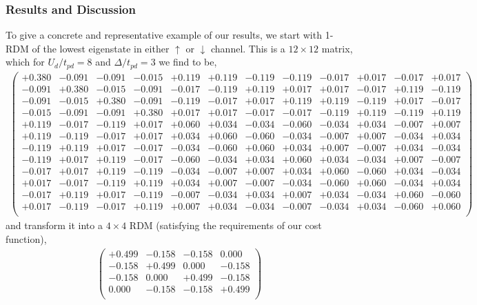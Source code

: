 \subsubsection{Results and Discussion}
To give a concrete and representative example of our results, we start with 1-RDM of the lowest eigenstate 
in either $\uparrow$ or $\downarrow$ channel. This is a $12 \times 12$ matrix, which for $U_{d}/t_{pd}=8$ 
and $\Delta/t_{pd}=3$ we find to be,
\begin{eqnarray}
\left(
\begin{array}{cccccccccccc}
+0.380	   & -0.091 &-0.091 &-0.015& +0.119& +0.119& -0.119 &-0.119 &-0.017 &+0.017 &-0.017 &+0.017 \\
-0.091	   & +0.380 &-0.015 &-0.091& -0.017& -0.119& +0.119 &+0.017 &+0.017 &-0.017 &+0.119 &-0.119 \\
-0.091	   & -0.015 &+0.380 &-0.091& -0.119& -0.017& +0.017 &+0.119 &+0.119 &-0.119 &+0.017 &-0.017 \\
-0.015	   & -0.091 &-0.091 &+0.380& +0.017& +0.017& -0.017 &-0.017 &-0.119 &+0.119 &-0.119 &+0.119 \\
+0.119	   & -0.017 &-0.119 &+0.017& +0.060& +0.034& -0.034 &-0.060 &-0.034 &+0.034 &-0.007 &+0.007 \\
+0.119	   & -0.119 &-0.017 &+0.017& +0.034& +0.060& -0.060 &-0.034 &-0.007 &+0.007 &-0.034 &+0.034 \\
-0.119	   & +0.119 &+0.017 &-0.017& -0.034& -0.060& +0.060 &+0.034 &+0.007 &-0.007 &+0.034 &-0.034 \\
-0.119	   & +0.017 &+0.119 &-0.017& -0.060& -0.034& +0.034 &+0.060 &+0.034 &-0.034 &+0.007 &-0.007 \\
-0.017	   & +0.017 &+0.119 &-0.119& -0.034& -0.007& +0.007 &+0.034 &+0.060 &-0.060 &+0.034 &-0.034 \\
+0.017	   & -0.017 &-0.119 &+0.119& +0.034& +0.007& -0.007 &-0.034 &-0.060 &+0.060 &-0.034 &+0.034 \\
-0.017	   & +0.119 &+0.017 &-0.119& -0.007& -0.034& +0.034 &+0.007 &+0.034 &-0.034 &+0.060 &-0.060 \\
+0.017	   & -0.119 &-0.017 &+0.119& +0.007& +0.034& -0.034 &-0.007 &-0.034 &+0.034 &-0.060 &+0.060 \\
\end{array}
\right)
\end{eqnarray}
and transform it into a $4\times4$ RDM (satisfying the requirements of our cost function), 
\begin{eqnarray}
\left(
\begin{array}{cccc}
+0.499 & -0.158 & -0.158 & 0.000  \\
-0.158 & +0.499 &  0.000 & -0.158 \\
-0.158 &  0.000 & +0.499 & -0.158 \\
 0.000 & -0.158 & -0.158 & +0.499 \\
\end{array}
\right)
\end{eqnarray}
